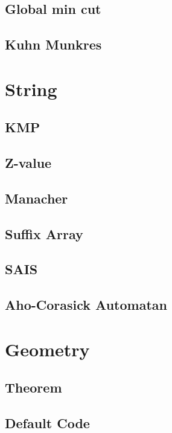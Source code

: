 \subsection{Global min cut}

\subsection{Kuhn Munkres}


\section{String}
\subsection{KMP}

\subsection{Z-value}

\subsection{Manacher}

\subsection{Suffix Array}

\subsection{SAIS}

\subsection{Aho-Corasick Automatan}


\section{Geometry}
\subsection{Theorem}

\subsection{Default Code}

